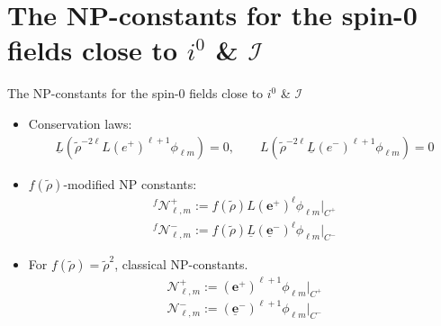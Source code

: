 \documentclass{beamer}
\theoremstyle{remark}
\theoremstyle{plain}
\theoremstyle{plain}
\begin{document}
\section{The NP-constants for the spin-0 fields close to $i^0$ \& $\mathscr{I}$}
\begin{frame}{The NP-constants for the spin-0 fields close to $i^0$ \& $\mathscr{I}$}
  \begin{itemize}
    \item Conservation laws:
    \begin{align*}
      {\underline{{L}}}({\tilde{\rho}}^{-2\ell}L(e^{+})^{\ell+1}\phi_{\ell m})=0, \qquad L({\tilde{\rho}}^{-2\ell}\underline{L}(e^{-})^{\ell+1}\phi_{\ell m})=0
    \end{align*}
    \item $f(\tilde{\rho})$-modified NP constants: 
    \begin{align*}
      {}^{f}\mathcal{N}^{+}_{\ell,m}:= f(\tilde{\rho})L (\boldsymbol{e}^{+})^{\ell}\phi_{\ell m} \Big|_{{C}^{+}}
    \end{align*}
    \begin{align*}
      {}^{f}\mathcal{N}^{-}_{\ell,m}:= f(\tilde{\rho})\underline{L} (\boldsymbol{\underline{e}}^{-})^{\ell}\phi_{\ell m}\Big|_{{C}^{-}}
    \end{align*}
    \item For $f(\tilde{\rho})=\tilde{\rho}^2$, classical NP-constants.
    \begin{align*}
      \mathcal{N}^{+}_{\ell,m}:= (\boldsymbol{e}^{+})^{\ell+1}\phi_{\ell m}\Big|_{{C}^{+}}
    \end{align*}
    \begin{equation}
      \mathcal{N}^{-}_{\ell,m}:= (\boldsymbol{\underline{e}}^{-})^{\ell+1}\phi_{\ell m} \Big|_{{C}^{-}} \nonumber
    \end{equation}
  \end{itemize}
\end{frame}

\end{document}
